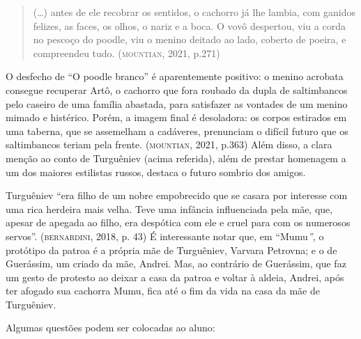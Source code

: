 \documentclass[11pt]{extarticle}
\begin{document}
\begin{quote}
(\ldots{}) antes de ele recobrar os sentidos, o cachorro já lhe lambia, com
ganidos felizes, as faces, os olhos, o nariz e a boca. O vovô despertou,
viu a corda no pescoço do poodle, viu o menino deitado ao lado, coberto
de poeira, e compreendeu tudo. (\textsc{mountian}, 2021, p.271)
\end{quote}

O desfecho de ``O poodle branco'' é aparentemente positivo: o menino
acrobata consegue recuperar Artô, o cachorro que fora roubado da dupla
de saltimbancos pelo caseiro de uma família abastada, para satisfazer as
vontades de um menino mimado e histérico. Porém, a imagem final é
desoladora: os corpos estirados em uma taberna, que se assemelham a
cadáveres, prenunciam o difícil futuro que os saltimbancos teriam pela
frente. (\textsc{mountian}, 2021, p.363) Além disso, a clara menção ao conto de
Turguêniev (acima referida), além de prestar homenagem a um dos maiores
estilistas russos, destaca o futuro sombrio dos amigos.


Turguêniev ``era filho de um nobre empobrecido que se casara por
interesse com uma rica herdeira mais velha. Teve uma infância
influenciada pela mãe, que, apesar de apegada ao filho, era despótica
com ele e cruel para com os numerosos servos''. (\textsc{bernardini}, 2018, p.
43) É interessante notar que, em ``Mumu\emph{'',} o protótipo da patroa
é a própria mãe de Turguêniev, Varvara Petrovna; e o de Guerássim, um
criado da mãe, Andrei. Mas, ao contrário de Guerássim, que faz um gesto
de protesto ao deixar a casa da patroa e voltar à aldeia, Andrei, após
ter afogado sua cachorra Mumu, fica até o fim da vida na casa da mãe de
Turguêniev.

Algumas questões podem ser colocadas ao aluno:
\end{document}
